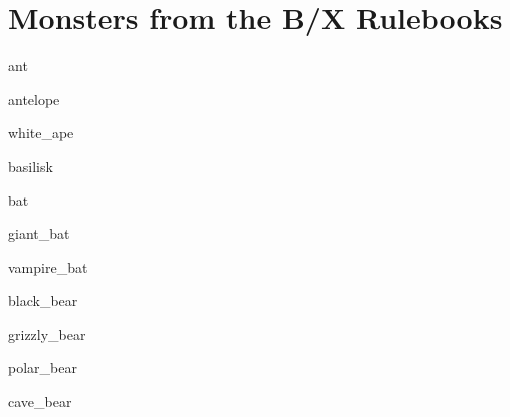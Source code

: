\documentclass[letterpaper,serif]{module}
\begin{document}
\raggedbottom

\part{Monsters from the B/X Rulebooks}

\begin{newmonster}{ant}
\lipsum[1]
\end{newmonster}

\begin{newmonster}{antelope}
\lipsum[2]
\end{newmonster}

\begin{newmonster}{white_ape}\end{newmonster}

\begin{newmonster}{basilisk}\end{newmonster}


\begin{newmonster}{bat}\end{newmonster}

\begin{newmonster}{giant_bat}\end{newmonster}

\begin{newmonster}{vampire_bat}\end{newmonster}


\begin{newmonster}{black_bear}\end{newmonster}

\begin{newmonster}{grizzly_bear}\end{newmonster}

\begin{newmonster}{polar_bear}\end{newmonster}

\begin{newmonster}{cave_bear}\end{newmonster}
\end{document}
